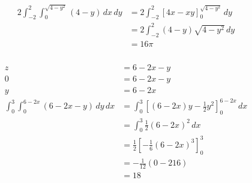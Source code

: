 \documentclass{article}
\begin{document}
\setcounter{subsubsection}{22}
\subsubsection{}

\begin{align*}
  2 \int_{-2}^2 \int_0^{\sqrt{4 - y^2}} (4 - y) \,dx \,dy & = 2 \int_{-2}^2 [4 x - x y]_0^{\sqrt{4 - y^2}} \,dy \\
                                                          & = 2 \int_{-2}^2 (4 - y) \sqrt{4 - y^2} \,dy         \\
                                                          & = 16 \pi
\end{align*}

\setcounter{subsubsection}{24}
\subsubsection{}

\begin{align*}
  z                                                & = 6 - 2 x - y                                                            \\
  0                                                & = 6 - 2 x - y                                                            \\
  y                                                & = 6 - 2 x                                                                \\
  \int_0^3 \int_0^{6 - 2 x} (6 - 2x - y) \,dy \,dx & = \int_0^3 \left[ (6 - 2 x) y - \frac{1}{2} y^2 \right]_0^{6 - 2 x} \,dx \\
                                                   & = \int_0^3 \frac{1}{2} (6 - 2 x)^2 \,dx                                  \\
                                                   & = \frac{1}{2} \left[ -\frac{1}{6} (6 - 2 x)^3 \right]_0^3                \\
                                                   & = -\frac{1}{12} (0 - 216)                                                \\
                                                   & = 18
\end{align*}

\setcounter{subsubsection}{26}
\subsubsection{}
\end{document}

